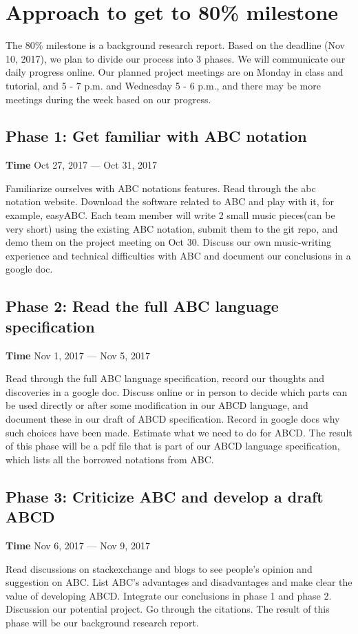 \section{Approach to get to 80\% milestone}
The 80\% milestone is a background research report. Based on the deadline (Nov 10, 2017), we plan to divide our process into 3 phases. We will communicate our daily progress online. Our planned project meetings are on Monday in class and tutorial, and 5 - 7 p.m. and Wednesday 5 - 6 p.m., and there may be more meetings during the week based on our progress.

\subsection{Phase 1: Get familiar with ABC notation}
\textbf{Time} Oct 27, 2017 --- Oct 31, 2017

\noindent Familiarize ourselves with ABC notations features. Read through the abc notation website. Download the software related to ABC and play with it, for example, easyABC. Each team member will write 2 small music pieces(can be very short) using the existing ABC notation, submit them to the git repo, and demo them on the project meeting on Oct 30. Discuss our own music-writing experience and technical difficulties with ABC and document our conclusions in a google doc.

\subsection{Phase 2: Read the full ABC language specification}
\textbf{Time} Nov 1, 2017 --- Nov 5, 2017

\noindent Read through the full ABC language specification, record our thoughts and discoveries in a google doc. Discuss online or in person to decide which parts can be used directly or after some modification in our ABCD language, and document these in our draft of ABCD specification. Record in google docs why such choices have been made. Estimate what we need to do for ABCD. The result of this phase will be a pdf file that is part of our ABCD language specification, which lists all the borrowed notations from ABC.

\subsection{Phase 3: Criticize ABC and develop a draft ABCD}
\textbf{Time} Nov 6, 2017 --- Nov 9, 2017

\noindent Read discussions on stackexchange and blogs to see people's opinion and suggestion on ABC. List ABC's advantages and disadvantages and make clear the value of developing ABCD. Integrate our conclusions in phase 1 and phase 2. Discussion our potential project. Go through the citations. The result of this phase will be our background research report.

